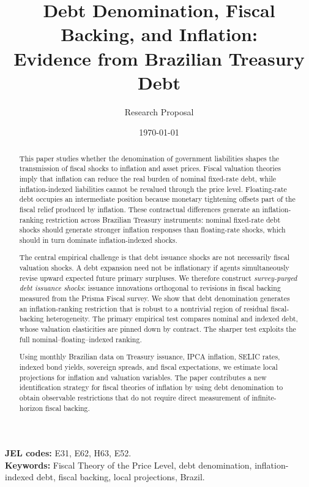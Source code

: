 \documentclass[12pt,a4paper]{article}
\title{\textbf{Debt Denomination, Fiscal Backing, and Inflation:\\ Evidence from Brazilian Treasury Debt}}
\author{Research Proposal}
\date{\today}
\begin{document}
\maketitle

\begin{abstract}
This paper studies whether the denomination of government liabilities shapes the transmission of fiscal shocks to inflation and asset prices. Fiscal valuation theories imply that inflation can reduce the real burden of nominal fixed-rate debt, while inflation-indexed liabilities cannot be revalued through the price level. Floating-rate debt occupies an intermediate position because monetary tightening offsets part of the fiscal relief produced by inflation. These contractual differences generate an inflation-ranking restriction across Brazilian Treasury instruments: nominal fixed-rate debt shocks should generate stronger inflation responses than floating-rate shocks, which should in turn dominate inflation-indexed shocks.

The central empirical challenge is that debt issuance shocks are not necessarily fiscal valuation shocks. A debt expansion need not be inflationary if agents simultaneously revise upward expected future primary surpluses. We therefore construct \emph{survey-purged debt issuance shocks}: issuance innovations orthogonal to revisions in fiscal backing measured from the Prisma Fiscal survey. We show that debt denomination generates an inflation-ranking restriction that is robust to a nontrivial region of residual fiscal-backing heterogeneity. The primary empirical test compares nominal and indexed debt, whose valuation elasticities are pinned down by contract. The sharper test exploits the full nominal--floating--indexed ranking.

Using monthly Brazilian data on Treasury issuance, IPCA inflation, SELIC rates, indexed bond yields, sovereign spreads, and fiscal expectations, we estimate local projections for inflation and valuation variables. The paper contributes a new identification strategy for fiscal theories of inflation by using debt denomination to obtain observable restrictions that do not require direct measurement of infinite-horizon fiscal backing.
\end{abstract}

\noindent \textbf{JEL codes:} E31, E62, H63, E52.\\
\textbf{Keywords:} Fiscal Theory of the Price Level, debt denomination, inflation-indexed debt, fiscal backing, local projections, Brazil.
\end{document}
